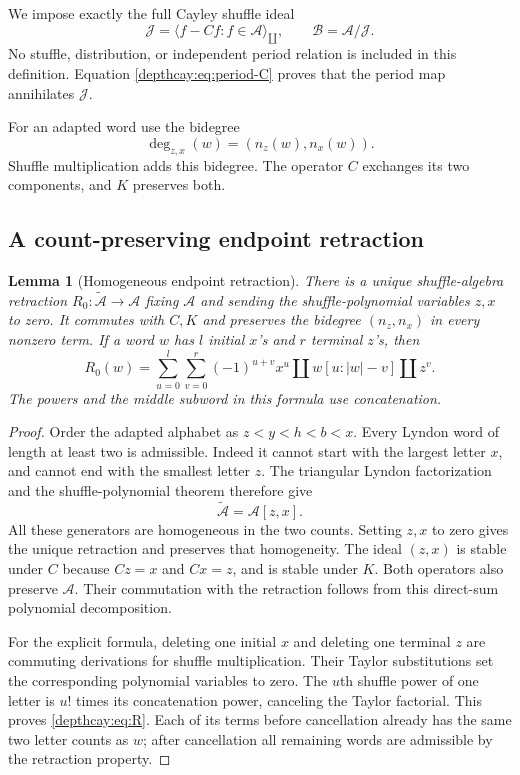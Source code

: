 \documentclass[11pt,a4paper]{article}
\numberwithin{equation}{section}
\newtheorem{lemma}[theorem]{Lemma}
\theoremstyle{definition}
\theoremstyle{remark}
\newcommand{\shuffle}{\mathbin{\amalg}}
\begin{document}
We impose exactly the full Cayley shuffle ideal
\begin{equation}\label{depthcay:eq:ideal}
 \mathcal J=\langle f-Cf:f\in\mathcal A\rangle_{\shuffle},
 \qquad \mathcal B=\mathcal A/\mathcal J.
\end{equation}
No stuffle, distribution, or independent period relation is included in
this definition. Equation \eqref{depthcay:eq:period-C} proves that the
period map annihilates $\mathcal J$.

For an adapted word use the bidegree
\[
 \deg_{z,x}(w)=(n_z(w),n_x(w)).
\]
Shuffle multiplication adds this bidegree. The operator $C$ exchanges
its two components, and $K$ preserves both.

\subsection{A count-preserving endpoint retraction}

\begin{lemma}[Homogeneous endpoint retraction]\label{depthcay:lem:R}
There is a unique shuffle-algebra retraction
$R_0:\widetilde{\mathcal A}\to\mathcal A$ fixing $\mathcal A$ and
sending the shuffle-polynomial variables $z,x$ to zero. It commutes
with $C,K$ and preserves the bidegree $(n_z,n_x)$ in every nonzero term.
If a word $w$ has $l$ initial $x$'s and $r$ terminal $z$'s, then
\begin{equation}\label{depthcay:eq:R}
 R_0(w)=\sum_{u=0}^{l}\sum_{v=0}^{r}(-1)^{u+v}
 x^u\shuffle w[u:|w|-v]\shuffle z^v.
\end{equation}
The powers and the middle subword in this formula use concatenation.
\end{lemma}

\begin{proof}
Order the adapted alphabet as $z<y<h<b<x$. Every Lyndon word of
length at least two is admissible. Indeed it cannot start with the
largest letter $x$, and cannot end with the smallest letter $z$.
The triangular Lyndon factorization and the shuffle-polynomial theorem
therefore give
\[
 \widetilde{\mathcal A}=\mathcal A[z,x].
\]
All these generators are homogeneous in the two counts. Setting $z,x$
to zero gives the unique retraction and preserves that homogeneity.
The ideal $(z,x)$ is stable under $C$ because $Cz=x$ and $Cx=z$,
and is stable under $K$. Both operators also preserve $\mathcal A$.
Their commutation with the retraction follows from this direct-sum
polynomial decomposition.

For the explicit formula, deleting one initial $x$ and deleting one
terminal $z$ are commuting derivations for shuffle multiplication.
Their Taylor substitutions set the corresponding polynomial variables
to zero. The $u$th shuffle power of one letter is $u!$ times its
concatenation power, canceling the Taylor factorial. This proves
\eqref{depthcay:eq:R}. Each of its terms before cancellation already
has the same two letter counts as $w$; after cancellation all remaining
words are admissible by the retraction property.
\end{proof}
\end{document}
